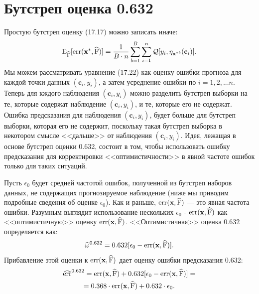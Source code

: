 \section{Бутстреп оценка 0.632}
Простую бутстреп оценку (17.17) можно записать иначе: 
\begin{equation}
\mathrm{E}_{\widehat{\text{F}}}[\text{err}(\textbf{x}^{*}, \widehat{\text{F}})] = \frac{1}{B\cdot n} \sum_{b = 1}^{B} \sum_{i = 1}^{n} \mathcal{Q}[y_{i},  \eta_{\textbf{x}^{*b}}(\textbf{c}_{i})].
\end{equation}
Мы можем рассматривать уравнение (17.22) как оценку ошибки прогноза для каждой точки данных $(\textbf{c}_{i}, y_{i})$, а затем усреднение ошибки по $i = 1, 2, ... n$. Теперь для кждого наблюдения $(\textbf{c}_{i}, y_{i})$ можно разделить бутстреп выборки на те, которые содержат наблюдение $(\textbf{c}_{i}, y_{i})$, и те, которые его не содержат. Ошибка предсказания для наблюдения $(\textbf{c}_{i}, y_{i})$, будет больше для бутстреп выборки, которая его не содержит, поскольку такая бутстреп выборка в некотором смысле <<дальше>> от наблюдения $(\textbf{c}_{i}, y_{i})$. Идея, лежащая в основе бутстреп оценки 0.632, состоит в том, чтобы использовать ошибку предсказания для корректировки <<оптимистичности>> в явной частоте ошибок только для таких ситуаций.

Пусть $\epsilon_{0}$ будет средней частотой ошибок, полученной из бутстреп наборов данных, не содержащих прогнозируемое наблюдение (ниже мы приводим подробные сведения об оценке $\epsilon_{0}$). Как и раньше, $\text{err}(\textbf{x}, \widehat{\text{F}})$ --- это явная частота ошибки. Разумным выглядит использование нескольких $\epsilon_{0}$ - $\text{err}(\textbf{x}, \widehat{\text{F}})$ как <<оптимистичную>> оценку  $\text{err}(\textbf{x}, \widehat{\text{F}})$. <<Оптимистичная>> оценка  $0.632$ определяется как:
\begin{equation}
\widehat{\omega}^{0.632} = 0.632[\epsilon_{0} - \text{err}(\textbf{x}, \widehat{\text{F}})].
\end{equation}
Прибавление этой оценки к $\text{err}(\textbf{x}, \widehat{\text{F}})$ дает оценку ошибки предсказания 0.632:
\begin{equation}
\begin{gathered}
\widehat{\text{err}}^{0.632} = \text{err}(\textbf{x}, \widehat{\text{F}}) + 0.632[\epsilon_{0} - \text{err}(\textbf{x}, \widehat{\text{F}})] = \\
= 0.368 \cdot \text{err}(\textbf{x}, \widehat{\text{F}}) + 0.632 \cdot \epsilon_{0}.
\end{gathered}
\end{equation}

